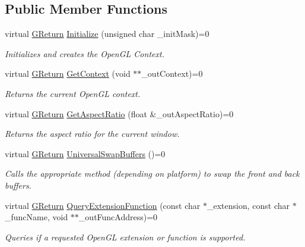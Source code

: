 \subsection*{Public Member Functions}
\begin{DoxyCompactItemize}
\item 
virtual \hyperlink{namespaceGW_a67a839e3df7ea8a5c5686613a7a3de21}{G\+Return} \hyperlink{classGW_1_1GRAPHICS_1_1GOpenGLSurface_a8c7024d100b7ac92d48ede83e677afca}{Initialize} (unsigned char \+\_\+init\+Mask)=0
\begin{DoxyCompactList}\small\item\em Initializes and creates the Open\+GL Context. \end{DoxyCompactList}\item 
virtual \hyperlink{namespaceGW_a67a839e3df7ea8a5c5686613a7a3de21}{G\+Return} \hyperlink{classGW_1_1GRAPHICS_1_1GOpenGLSurface_acc0962496aab996bddae1b84a5d178b9}{Get\+Context} (void $\ast$$\ast$\+\_\+out\+Context)=0
\begin{DoxyCompactList}\small\item\em Returns the current Open\+GL context. \end{DoxyCompactList}\item 
virtual \hyperlink{namespaceGW_a67a839e3df7ea8a5c5686613a7a3de21}{G\+Return} \hyperlink{classGW_1_1GRAPHICS_1_1GOpenGLSurface_ad660a6eed3ca53cc7eab24ae855b6572}{Get\+Aspect\+Ratio} (float \&\+\_\+out\+Aspect\+Ratio)=0
\begin{DoxyCompactList}\small\item\em Returns the aspect ratio for the current window. \end{DoxyCompactList}\item 
virtual \hyperlink{namespaceGW_a67a839e3df7ea8a5c5686613a7a3de21}{G\+Return} \hyperlink{classGW_1_1GRAPHICS_1_1GOpenGLSurface_a6a7fda7ba935e9fc22cd94ac47ebe886}{Universal\+Swap\+Buffers} ()=0
\begin{DoxyCompactList}\small\item\em Calls the appropriate method (depending on platform) to swap the front and back buffers. \end{DoxyCompactList}\item 
virtual \hyperlink{namespaceGW_a67a839e3df7ea8a5c5686613a7a3de21}{G\+Return} \hyperlink{classGW_1_1GRAPHICS_1_1GOpenGLSurface_a045548083dbdd547b18ef9b9a896f0de}{Query\+Extension\+Function} (const char $\ast$\+\_\+extension, const char $\ast$\+\_\+func\+Name, void $\ast$$\ast$\+\_\+out\+Func\+Address)=0
\begin{DoxyCompactList}\small\item\em Queries if a requested Open\+GL extension or function is supported. \end{DoxyCompactList}\item 

\end{DoxyCompactItemize}
